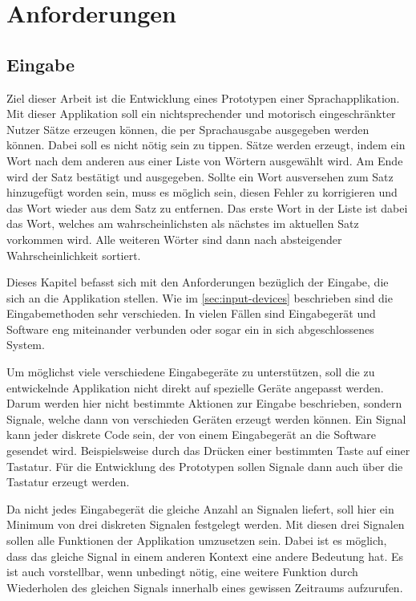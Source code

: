 \section{Anforderungen}
	\label{sec:requirements}
    
	\subsection{Eingabe}
    \label{sec:requirements-input}
 
    	Ziel dieser Arbeit ist die Entwicklung eines Prototypen einer Sprachapplikation. Mit dieser Applikation soll ein nichtsprechender und motorisch eingeschränkter Nutzer Sätze erzeugen können, die per Sprachausgabe ausgegeben werden können. Dabei soll es nicht nötig sein zu tippen. Sätze werden erzeugt, indem ein Wort nach dem anderen aus einer Liste von Wörtern ausgewählt wird. Am Ende wird der Satz bestätigt und ausgegeben. Sollte ein Wort ausversehen zum Satz hinzugefügt worden sein, muss es möglich sein, diesen Fehler zu korrigieren und das Wort wieder aus dem Satz zu entfernen. Das erste Wort in der Liste ist dabei das Wort, welches am wahrscheinlichsten als nächstes im aktuellen Satz vorkommen wird. Alle weiteren Wörter sind dann nach absteigender Wahrscheinlichkeit sortiert.
         
    	Dieses Kapitel befasst sich mit den Anforderungen bezüglich der Eingabe, die sich an die Applikation stellen. Wie im \autoref{sec:input-devices} beschrieben sind die Eingabemethoden sehr verschieden. In vielen Fällen sind Eingabegerät und Software eng miteinander verbunden oder sogar ein in sich abgeschlossenes System.
        
        Um möglichst viele verschiedene Eingabegeräte zu unterstützen, soll die zu entwickelnde Applikation nicht direkt auf spezielle Geräte angepasst werden. Darum werden hier nicht bestimmte Aktionen zur Eingabe beschrieben, sondern Signale, welche dann von verschieden Geräten erzeugt werden können. Ein Signal kann jeder diskrete Code sein, der von einem Eingabegerät an die Software gesendet wird. Beispielsweise durch das Drücken einer bestimmten Taste auf einer Tastatur. Für die Entwicklung des Prototypen sollen Signale dann auch über die Tastatur erzeugt werden. 
        
        Da nicht jedes Eingabegerät die gleiche Anzahl an Signalen liefert, soll hier ein Minimum von drei diskreten Signalen festgelegt werden. Mit diesen drei Signalen sollen alle Funktionen der Applikation umzusetzen sein. Dabei ist es möglich, dass das gleiche Signal in einem anderen Kontext eine andere Bedeutung hat. Es ist auch vorstellbar, wenn unbedingt nötig, eine weitere Funktion durch Wiederholen des gleichen Signals innerhalb eines gewissen Zeitraums aufzurufen. 
        
